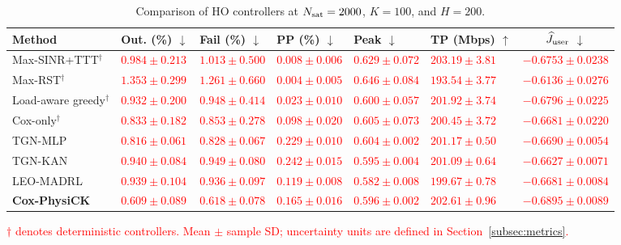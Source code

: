 \documentclass[10pt,letterpaper,journal]{IEEEtran}
\newcommand{\revnew}[1]{\textcolor{red}{#1}}
\begin{document}
\begin{table}[t]
\centering
\caption{Comparison of HO controllers at $N_{\rm sat}=2000$, $K=100$, and $H=200$.}
\label{tab:traditional_baselines}
\footnotesize
\renewcommand{\arraystretch}{1.10}
\setlength{\tabcolsep}{2.5pt}
\begin{tabularx}{\textwidth}{@{}>{\raggedright\arraybackslash}p{}*{5}{>{\centering\arraybackslash}X} c@{}}
\toprule
Method & Out. (\%) $\downarrow$ & Fail (\%) $\downarrow$ & PP (\%) $\downarrow$ & Peak $\downarrow$ & \makecell{TP\\(Mbps) $\uparrow$} & $\widehat J_{\rm user}$ $\downarrow$ \\
\midrule
Max-SINR+TTT$^{\dagger}$ & \revnew{$0.984\pm0.213$} & \revnew{$1.013\pm0.500$} & \revnew{$0.008\pm0.006$} & \revnew{$0.629\pm0.072$} & \revnew{$203.19\pm3.81$} & \revnew{$-0.6753\pm0.0238$} \\
Max-RST$^{\dagger}$ & \revnew{$1.353\pm0.299$} & \revnew{$1.261\pm0.660$} & \revnew{$0.004\pm0.005$} & \revnew{$0.646\pm0.084$} & \revnew{$193.54\pm3.77$} & \revnew{$-0.6136\pm0.0276$} \\
Load-aware greedy$^{\dagger}$ & \revnew{$0.932\pm0.200$} & \revnew{$0.948\pm0.414$} & \revnew{$0.023\pm0.010$} & \revnew{$0.600\pm0.057$} & \revnew{$201.92\pm3.74$} & \revnew{$-0.6796\pm0.0225$} \\
Cox-only$^{\dagger}$ & \revnew{$0.833\pm0.182$} & \revnew{$0.853\pm0.278$} & \revnew{$0.098\pm0.020$} & \revnew{$0.605\pm0.073$} & \revnew{$200.45\pm3.72$} & \revnew{$-0.6681\pm0.0220$} \\
TGN-MLP & \revnew{$0.816\pm0.061$} & \revnew{$0.828\pm0.067$} & \revnew{$0.229\pm0.010$} & \revnew{$0.604\pm0.002$} & \revnew{$201.17\pm0.50$} & \revnew{$-0.6690\pm0.0054$} \\
TGN-KAN & \revnew{$0.940\pm0.084$} & \revnew{$0.949\pm0.080$} & \revnew{$0.242\pm0.015$} & \revnew{$0.595\pm0.004$} & \revnew{$201.09\pm0.64$} & \revnew{$-0.6627\pm0.0071$} \\
LEO-MADRL & \revnew{$0.939\pm0.104$} & \revnew{$0.936\pm0.097$} & \revnew{$0.119\pm0.008$} & \revnew{$0.582\pm0.008$} & \revnew{$199.67\pm0.78$} & \revnew{$-0.6681\pm0.0084$} \\
\textbf{Cox-PhysiCK} & \revnew{$0.609\pm0.089$} & \revnew{$0.618\pm0.078$} & \revnew{$0.165\pm0.016$} & \revnew{$0.596\pm0.002$} & \revnew{$202.61\pm0.96$} & \revnew{$-0.6895\pm0.0089$} \\
\bottomrule
\end{tabularx}
\par\vspace{3pt}
\begin{minipage}{\textwidth}\footnotesize
\revnew{$\dagger$ denotes deterministic controllers. Mean $\pm$ sample SD; uncertainty units are defined in Section~\ref{subsec:metrics}.}
\end{minipage}
\end{table}
\end{document}
